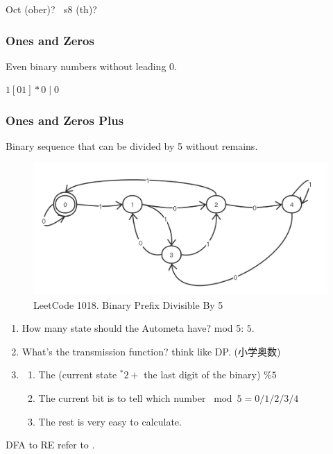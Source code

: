 \documentclass[a4paper]{exam}
\begin{document}
\begin{solution}
  Oct (ober)? $\ $ s8 (th)?
\end{solution}

\subsubsection{Ones and Zeros}
Even binary numbers without leading 0.
\begin{solution}
  $1[01] * 0 \mid 0$
\end{solution}
\subsubsection{Ones and Zeros Plus}
Binary sequence that can be divided by 5 without remains.
\begin{figure}[h]
  \centering
  \includegraphics[width=\linewidth]{./img/leading_five.png}
  \caption{LeetCode 1018. Binary Prefix Divisible By 5}
\end{figure}
\begin{solution}
  \begin{enumerate}
    \item How many state should the Autometa have? mod 5: $5 .$
    \item What's the transmission function? think like DP. (小学奥数)
          \item\begin{enumerate} \item The (current state $^{*} 2+$ the last digit of the binary) $\% 5$
            \item The current bit is to tell which number $\bmod 5=0 / 1 / 2 / 3 / 4$
            \item The rest is very easy to calculate.
          \end{enumerate}\end{enumerate}

  DFA to RE refer to \cite{dfatoregex}.
\end{solution}

\printbibliography
\end{document}
